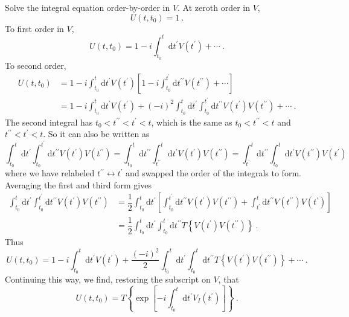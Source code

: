 \documentclass[11pt,a4paper]{article}
\newcommand{\dif}{\mathrm{d}}
\begin{document}
Solve the integral equation order-by-order in $V$. At zeroth order in $V$,
\begin{equation}
U(t,t_0) = 1 ~.
\end{equation}
To first order in $V$,
\begin{equation}
U(t,t_0) = 1 -i \int_{t_0}^t \dif t^\prime V(t^\prime) + \cdots ~.
\end{equation}
To second order,
\begin{align}
\nonumber U(t,t_0) &= 1 -i \int_{t_0}^t \dif t^\prime V(t^\prime) \left[1 - i \int_{t_0}^{t^\prime} \dif t^{\prime \prime} V(t^{\prime \prime}) +\cdots  \right] \\
&= 1 -i \int_{t_0}^t \dif t^\prime V(t^\prime) +(-i)^2 \int_{t_0}^{t} \dif t^{\prime} \int_{t_0}^{t^\prime} \dif t^{\prime \prime} V(t^{\prime})V(t^{\prime \prime}) +\cdots ~.
\end{align}
The second integral has $t_0 < t^{\prime \prime} < t^{\prime} < t$, which is the same as $t_0 < t^{\prime \prime} < t$ and $t^{\prime \prime} < t^{ \prime} < t$. So it can also be written as
\begin{equation}
 \int_{t_0}^{t} \dif t^{\prime} \int_{t_0}^{t^\prime} \dif t^{\prime \prime} V(t^{\prime})V(t^{\prime \prime}) = \int_{t_0}^{t} \dif t^{\prime \prime} \int_{t^{\prime\prime} }^{t} \dif t^{\prime} V(t^{\prime})V(t^{\prime \prime}) = \int_{t^{\prime} }^{t} \dif t^{\prime \prime}   \int_{t_0}^{t}  \dif t^{\prime} V(t^{\prime \prime})V(t^{\prime})
\end{equation}
where we have relabeled $t^{\prime\prime} \leftrightarrow t^{\prime}$ and swapped the order of the integrals to form. Averaging the first and third form gives
\begin{align}
\nonumber \int_{t_0}^{t} \dif t^{\prime} \int_{t_0}^{t^\prime} \dif t^{\prime \prime} V(t^{\prime})V(t^{\prime \prime}) &= \dfrac{1}{2}  \int_{t_0}^{t} \dif t^{\prime} \left[ \int_{t_0}^{t^\prime} \dif t^{\prime \prime} V(t^{\prime})V(t^{\prime \prime}) + \int_{t^\prime}^t \dif t^{\prime \prime} V(t^{\prime \prime}) V(t^{\prime}) \right] \\
 &= \dfrac{1}{2}  \int_{t_0}^{t} \dif t^{\prime} \int_{t_0}^t \dif t^{\prime \prime} T\left\{V(t^\prime) V(t^{\prime\prime}) \right\} ~.
\end{align}
Thus 
\begin{equation}
U(t,t_0) = 1 -i\int_{t_0}^t \dif t^\prime V(t^\prime) + \dfrac{(-i)^2}{2} \int_{t_0}^t \dif t^\prime \int_{t_0}^t \dif t^{\prime\prime}  T\left\{V(t^\prime) V(t^{\prime\prime}) \right\}  +\cdots ~.
\end{equation}
Continuing this way, we find, restoring the subscript on $V$, that
\begin{equation}
U(t,t_0) = T\left\{\exp \left[-i \int_{t_0}^t \dif t^\prime V_I(t^\prime) \right] \right\} ~.
\end{equation}
\end{document}
